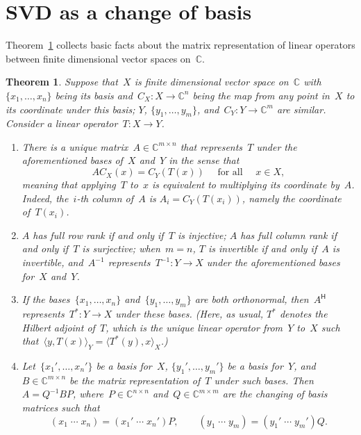 \documentclass[11pt,a4paper]{article}  %
\numberwithin{equation}{section}
\newtheorem{theorem}{Theorem}%
\theoremstyle{definition}
\def\CC{\mathbb{C}}
\newcommand{\sss}[1]{{\scriptscriptstyle{#1}}}
\newcommand{\hmt}{{\scriptscriptstyle{{\mathsf{H}}}}}
\newcommand{\inv}{{-1}}
\newcommand{\adj}{*}
\newcommand{\range}{\mathrm{range}}
\begin{document}
\section{SVD as a change of basis}


Theorem~\ref{th:matrix} collects basic facts about the matrix representation of linear operators
between finite dimensional vector spaces on~$\CC$.

\begin{theorem}
  \label{th:matrix}
  Suppose that~$X$ is finite dimensional vector space on~$\CC$ with $\{x_1,  \dots,
  x_n\}$ being its basis and~$C_\sss{X} : X \to \CC^{n}$ being the map from any point in~$X$ to its
  coordinate under this basis; $Y$, $\{y_1, \dots, y_m\}$, and~$C_\sss{Y} : Y \to \CC^{m}$ are similar.
  Consider a linear operator~$T \mathrel{:} X \to Y$.
  \begin{enumerate}[leftmargin=1.5em]
    \item There is a unique matrix~$A\in \CC^{m\times n}$
   that represents~$T$ under the aforementioned bases of~$X$ and~$Y$ in the sense that
  \begin{equation*}
    A C_\sss{X} (x) = C_\sss{Y} (T (x)) \quad \text{ for all } \quad x\in X,
  \end{equation*}
  meaning that applying~$T$ to~$x$ is equivalent to multiplying its coordinate by~$A$.
  Indeed, the~$i$-th column of~$A$ is $A_i = C_\sss{Y}(T(x_i))$, namely the coordinate of~$T(x_i)$.
\item $A$ has full row rank if and only if~$T$ is injective; $A$ has full column rank if and only
  if~$T$ is surjective;
  when~$m=n$, $T$ is invertible if and only if~$A$ is invertible, and~$A^\inv$
  represents~$T^\inv\mathrel{:} Y\to X$ under the aforementioned bases for~$X$ and~$Y$.
\item If the bases~$\{x_1, \dots, x_n\}$ and~$\{y_1, \dots, y_m\}$ are both orthonormal,
    then~$A^\hmt$ represents~$T^\adj \mathrel{:} Y \to X$ under these bases.
    \textnormal{(}Here, as usual,
    $T^*$ denotes the Hilbert adjoint of~$T$, which is the unique linear operator from~$Y$
to~$X$ such that~$\langle y, T(x) \rangle_\sss{Y} = \langle T^\adj(y), x\rangle_\sss{X}$.\textnormal{)}
\item Let~$\{x_1', \dots, x_n'\}$ be a basis for~$X$, $\{y_1', \dots, y_m'\}$ be a
  basis for~$Y$, and~$B\in \CC^{m\times n}$ be the matrix representation of~$T$ under such bases.
  Then~$A = Q^\inv B P$, where~$P\in \CC^{n\times n}$ and~$Q\in \CC^{m \times m}$
  are the changing of basis matrices such that
  \begin{equation*}
    (x_1\; \cdots\; x_n) = (x_1'\; \cdots\; x_n')P, \qquad
    (y_1\; \cdots\; y_m) = (y_1'\; \cdots\; y_m')Q.
  \end{equation*}
  \end{enumerate}
\end{theorem}
\end{document}
